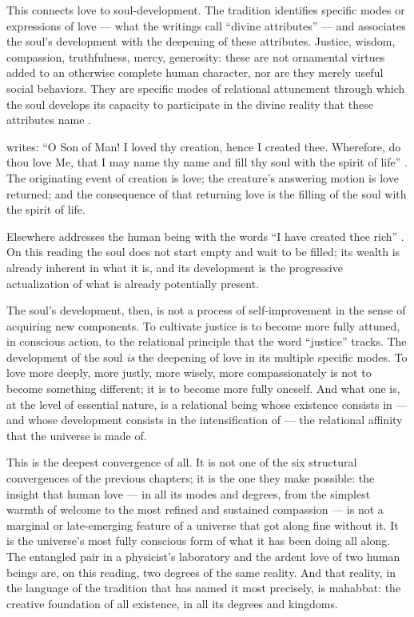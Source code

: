 This connects love to soul-development. The \bahai tradition identifies specific modes or expressions of love — what the writings call ``divine attributes'' — and associates the soul's development with the deepening of these attributes. Justice, wisdom, compassion, truthfulness, mercy, generosity: these are not ornamental virtues added to an otherwise complete human character, nor are they merely useful social behaviors. They are specific modes of relational attunement through which the soul develops its capacity to participate in the divine reality that these attributes name \citep{GleaningsBahaullah, SelectionsAbdul}.

\Bahaullah writes: ``O Son of Man! I loved thy creation, hence I created thee. Wherefore, do thou love Me, that I may name thy name and fill thy soul with the spirit of life'' \citep[Arabic no.~4]{HiddenWords}. The originating event of creation is love; the creature's answering motion is love returned; and the consequence of that returning love is the filling of the soul with the spirit of life.

Elsewhere \Bahaullah addresses the human being with the words ``I have created thee rich'' \citep[Arabic no.~11]{HiddenWords}. On this reading the soul does not start empty and wait to be filled; its wealth is already inherent in what it is, and its development is the progressive actualization of what is already potentially present.

The soul's development, then, is not a process of self-improvement in the sense of acquiring new components. To cultivate justice is to become more fully attuned, in conscious action, to the relational principle that the word ``justice'' tracks. The development of the soul \emph{is} the deepening of love in its multiple specific modes. To love more deeply, more justly, more wisely, more compassionately is not to become something different; it is to become more fully oneself. And what one is, at the level of essential nature, is a relational being whose existence consists in — and whose development consists in the intensification of — the relational affinity that the universe is made of.

This is the deepest convergence of all. It is not one of the six structural convergences of the previous chapters; it is the one they make possible: the insight that human love — in all its modes and degrees, from the simplest warmth of welcome to the most refined and sustained compassion — is not a marginal or late-emerging feature of a universe that got along fine without it. It is the universe's most fully conscious form of what it has been doing all along. The entangled pair in a physicist's laboratory and the ardent love of two human beings are, on this reading, two degrees of the same reality. And that reality, in the language of the tradition that has named it most precisely, is mahabbat: the creative foundation of all existence, in all its degrees and kingdoms.

